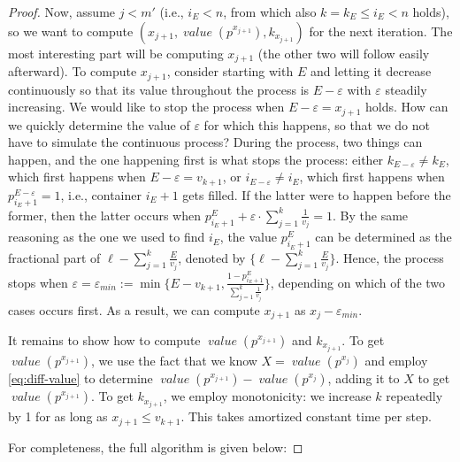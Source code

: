 \documentclass[sigconf,nonacm]{aamas}
\DeclareMathOperator{\valueText}{\textit{value}}
\newcommand{\val}[1]{\valueText({#1})}
\begin{document}
\begin{proof}
Now, assume $j < m'$ (i.e., $i_E < n$, from which also $k = k_E \leq i_E < n$ holds), so we want to compute $(x_{j + 1}, \val{p^{x_{j + 1}}}, k_{x_{j + 1}})$ for the next iteration. The most interesting part will be computing $x_{j + 1}$ (the other two will follow easily afterward). To compute $x_{j + 1}$, consider starting with $E$ and letting it decrease continuously so that its value throughout the process is $E - \varepsilon$ with $\varepsilon$ steadily increasing. We would like to stop the process when $E - \varepsilon = x_{j + 1}$ holds. How can we quickly determine the value of $\varepsilon$ for which this happens, so that we do not have to simulate the continuous process? During the process, two things can happen, and the one happening first is what stops the process: either $k_{E - \varepsilon} \neq k_{E}$, which first happens when $E - \varepsilon = v_{k + 1}$, or $i_{E - \varepsilon} \neq i_{E}$, which first happens when $p^{E - \varepsilon}_{i_E + 1} = 1$, i.e., container $i_E + 1$ gets filled. If the latter were to happen before the former, then the latter occurs when $p^E_{i_E + 1} + \varepsilon \cdot \sum_{j = 1}^k \frac{1}{v_j} = 1$. By the same reasoning as the one we used to find $i_E$, the value $p^E_{i_E + 1}$ can be determined as the fractional part of $\ell - \sum_{j = 1}^k\frac{E}{v_j}$, denoted by $\{\ell - \sum_{j = 1}^k\frac{E}{v_j}\}$. Hence, the process stops when $\varepsilon = \varepsilon_\mathit{min} := \min\{E - v_{k + 1}, \frac{1 - p^E_{i_E + 1}}{\sum_{j = 1}^k \frac{1}{v_j}}\}$, depending on which of the two cases occurs first. As a result, we can compute $x_{j + 1}$ as $x_j - \varepsilon_\mathit{min}$.

It remains to show how to compute $ \val{p^{x_{j + 1}}}$ and $k_{x_{j + 1}}$. To get $\val{p^{x_{j + 1}}}$, we use the fact that we know $X = \val{p^{x_j}}$ and employ \cref{eq:diff-value} to determine $\val{p^{x_{j + 1}}} - \val{p^{x_j}}$, adding it to $X$ to get $\val{p^{x_{j + 1}}}$. To get $k_{x_{j + 1}}$, we employ monotonicity: we increase $k$ repeatedly by 1 for as long as $x_{j + 1} \leq v_{k + 1}$. This takes amortized constant time per step.

For completeness, the full algorithm is given below:


\end{proof}
\end{document}
